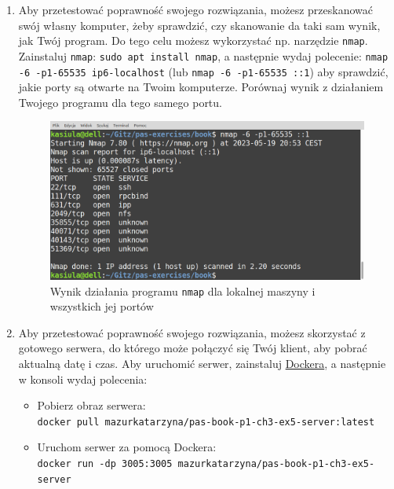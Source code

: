 \begin{enumerate}[label=\textbf{3.\arabic*}]
\item Aby przetestować poprawność swojego rozwiązania, możesz przeskanować swój własny komputer, żeby sprawdzić, czy skanowanie da taki sam wynik, jak Twój program. Do tego celu możesz wykorzystać np. narzędzie \texttt{nmap}. Zainstaluj \texttt{nmap}: \texttt{sudo apt install nmap}, a następnie wydaj polecenie: \texttt{nmap -6 -p1-65535 ip6-localhost} (lub \texttt{nmap -6 -p1-65535 ::1}) aby sprawdzić, jakie porty są otwarte na Twoim komputerze. Porównaj wynik z działaniem Twojego programu dla tego samego portu.  

\begin{figure}[h]
\caption{Wynik działania programu \texttt{nmap} dla lokalnej maszyny i wszystkich jej portów}
\centering
\includegraphics[scale=0.35]{./images/answers/ex3.4-nmap.png}
\end{figure}   

\item Aby przetestować poprawność swojego rozwiązania, możesz skorzystać z gotowego serwera, do którego może połączyć się Twój klient, aby pobrać aktualną datę i czas. Aby uruchomić serwer, zainstaluj \href{https://www.docker.com/}{Dockera}, a następnie w konsoli wydaj polecenia:

\begin{itemize}
\item Pobierz obraz serwera:\\ \texttt{docker pull mazurkatarzyna/pas-book-p1-ch3-ex5-server:latest}

\item Uruchom serwer za pomocą Dockera:\\ \texttt{docker run -dp 3005:3005 mazurkatarzyna/pas-book-p1-ch3-ex5-server}
\end{itemize}


\end{enumerate}
